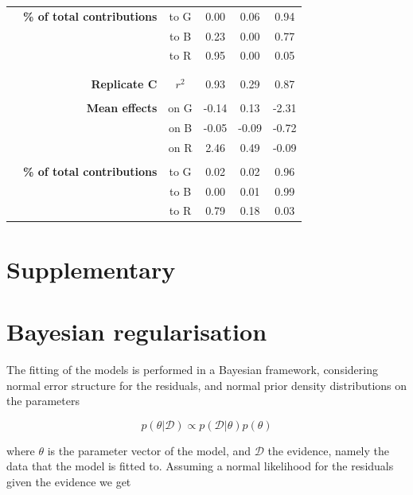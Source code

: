 \documentclass[11pt, oneside]{article}
\newcommand{\beginsupplement}{%
        \setcounter{table}{0}
        \renewcommand{\thetable}{S\arabic{table}}%
        \setcounter{figure}{0}
        \renewcommand{\thefigure}{S\arabic{figure}}%
     }
\begin{document}
\begin{table}[H]
\begin{center}
\begin{tabular}{rrcccc}
	& \textbf{\% of total contributions} 
    &   to G &  0.00 &  0.06 &  0.94 \\ 
    & & to B &  0.23 &  0.00 &  0.77 \\
    & & to R &  0.95 &  0.00 &  0.05 \\
	& \\
	\hline
	& \\
    & \textbf{Replicate C} & $r^2$  &  0.93 & 0.29 & 0.87 \\
	& \\
	& \textbf{Mean effects} 
    &   on G & -0.14 &  0.13 & -2.31 \\
    & & on B & -0.05 & -0.09 & -0.72 \\
    & & on R &  2.46 &  0.49 & -0.09 \\
	& \\
	& \textbf{\% of total contributions} 
    &   to G &  0.02 &  0.02 &  0.96 \\
    & & to B &  0.00 &  0.01 &  0.99 \\
    & & to R &  0.79 &  0.18 &  0.03 \\
\end{tabular}
\end{center}
\end{table}
\newpage

\newpage
\section{Supplementary}
\appendix
\beginsupplement

\section{Bayesian regularisation}

The fitting of the models is performed in a Bayesian framework, considering normal error structure for the residuals, and normal prior density distributions on the parameters

\vspace{-0.5cm}
\begin{equation}
	p(\theta | \mathcal{D}) \propto  p(\mathcal{D} | \theta) p(\theta)
\end{equation}

where $\theta$ is the parameter vector of the model, and $\mathcal{D}$ the evidence, namely the data that the model is fitted to.
Assuming a normal likelihood for the residuals given the evidence we get
\end{document}
